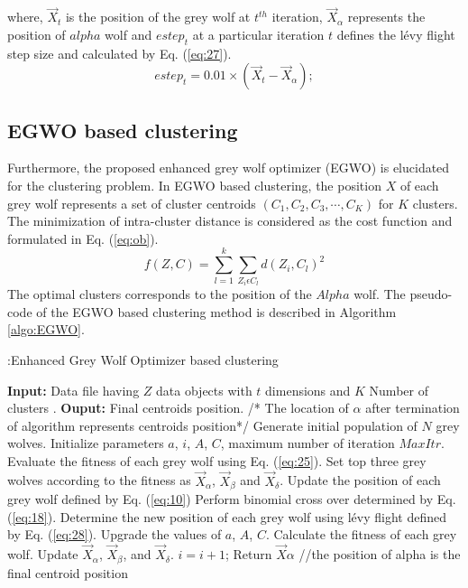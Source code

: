 \documentclass[review]{elsarticle}
\begin{document}
where, $\overrightarrow X_t$ is the position of the grey wolf at $t^{th}$ iteration, $\overrightarrow X_{\alpha}$ represents the position of $alpha$ wolf and $estep_t$ at a particular iteration $t$ defines the l\'{e}vy flight step size and calculated by Eq. (\ref{eq:27}).
\begin{equation}\label{eq:27}
                                                   estep_t=0.01\times(\overrightarrow X_t-\overrightarrow X_{\alpha});
                                                \end{equation}
\subsection{EGWO based clustering}
Furthermore, the proposed enhanced grey wolf optimizer (EGWO) is elucidated for  the clustering problem. In EGWO based clustering, the position $X$ of each grey wolf represents a set of cluster centroids ${(C_1,C_2,C_3, \cdots, C_K)}$ for $K$ clusters.  The minimization of intra-cluster distance is considered as the cost function and formulated in Eq. (\ref{eq:ob}).
\begin{equation}\label{eq:ob}
      f(Z,C)=\sum_{l=1}^k\sum_{Z_i\epsilon C_l}d(Z_i,C_l)^2
\end{equation}
The optimal clusters corresponds to the position of the $Alpha$ wolf. The pseudo-code of the EGWO based clustering method is described in Algorithm \ref{algo:EGWO}. 

 \begin{algorithm}
\caption{:Enhanced Grey Wolf Optimizer based clustering}
\label{algo:EGWO}
\begin{algorithmic}
\STATE\textbf{Input:} Data file having $Z$ data objects with $t$ dimensions and $K$ Number of clusters .
\STATE\textbf{Ouput:} Final centroids position.           /* The location of $\alpha$ after termination of algorithm represents centroids position*/
\STATE Generate initial population of $N$ grey wolves.
\STATE Initialize parameters $a$, $i$, $A$, $C$, maximum number of iteration $MaxItr$.
\STATE  Evaluate the fitness of each grey wolf using Eq. (\ref{eq:25}).
\STATE Set top three grey wolves according to the fitness as $\overrightarrow X_{\alpha}$, $\overrightarrow X_{\beta}$ and $\overrightarrow X_{\delta}$.
  \STATE Update the position of each grey wolf defined by Eq. (\ref{eq:10})
   \STATE Perform binomial cross over determined by Eq. (\ref{eq:18}).
  \STATE Determine the new position of each grey wolf using l\'{e}vy flight defined by Eq. (\ref{eq:28}).
  \STATE Upgrade the values of $a$, $A$, $C$.
  \STATE Calculate the fitness of each grey wolf.
  \STATE Update $\overrightarrow X_{\alpha}$, $\overrightarrow X_{\beta}$, and $\overrightarrow X_{\delta}$.
    \ENDFOR
\STATE  $i=i+1$; 
\ENDWHILE
\STATE Return $\overrightarrow X{\alpha}$  //the position of alpha is the final centroid position
\end{algorithmic}
\end{algorithm}
\end{document}
